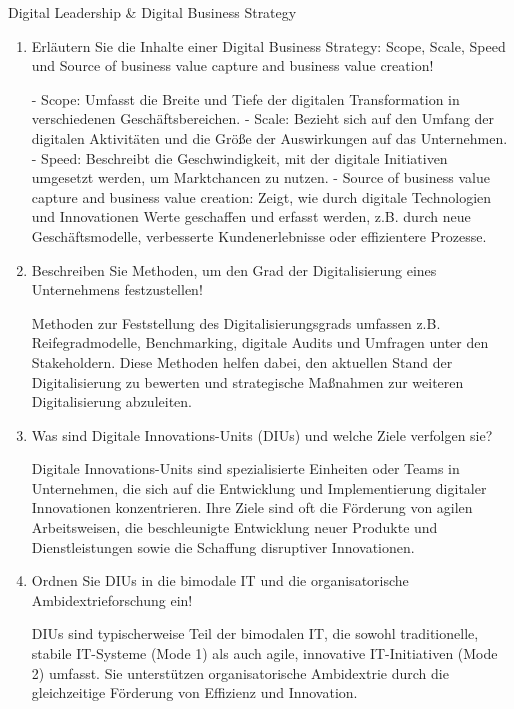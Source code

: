 \documentclass{article}
\begin{document}
\begin{exercise}{Digital Leadership \& Digital Business Strategy}
\begin{enumerate}
    \item Erläutern Sie die Inhalte einer Digital Business Strategy: Scope, Scale, Speed und Source of business value capture and business value creation!
          \begin{solution}
            - Scope: Umfasst die Breite und Tiefe der digitalen Transformation in verschiedenen Geschäftsbereichen.
            - Scale: Bezieht sich auf den Umfang der digitalen Aktivitäten und die Größe der Auswirkungen auf das Unternehmen.
            - Speed: Beschreibt die Geschwindigkeit, mit der digitale Initiativen umgesetzt werden, um Marktchancen zu nutzen.
            - Source of business value capture and business value creation: Zeigt, wie durch digitale Technologien und Innovationen Werte geschaffen und erfasst werden, z.B. durch neue Geschäftsmodelle, verbesserte Kundenerlebnisse oder effizientere Prozesse.
          \end{solution}

    \item Beschreiben Sie Methoden, um den Grad der Digitalisierung eines Unternehmens festzustellen!
          \begin{solution}
            Methoden zur Feststellung des Digitalisierungsgrads umfassen z.B. Reifegradmodelle, Benchmarking, digitale Audits und Umfragen unter den Stakeholdern. Diese Methoden helfen dabei, den aktuellen Stand der Digitalisierung zu bewerten und strategische Maßnahmen zur weiteren Digitalisierung abzuleiten.
          \end{solution}

    \item Was sind Digitale Innovations-Units (DIUs) und welche Ziele verfolgen sie?
          \begin{solution}
            Digitale Innovations-Units sind spezialisierte Einheiten oder Teams in Unternehmen, die sich auf die Entwicklung und Implementierung digitaler Innovationen konzentrieren. Ihre Ziele sind oft die Förderung von agilen Arbeitsweisen, die beschleunigte Entwicklung neuer Produkte und Dienstleistungen sowie die Schaffung disruptiver Innovationen.
          \end{solution}

    \item Ordnen Sie DIUs in die bimodale IT und die organisatorische Ambidextrieforschung ein!
          \begin{solution}
            DIUs sind typischerweise Teil der bimodalen IT, die sowohl traditionelle, stabile IT-Systeme (Mode 1) als auch agile, innovative IT-Initiativen (Mode 2) umfasst. Sie unterstützen organisatorische Ambidextrie durch die gleichzeitige Förderung von Effizienz und Innovation.
          \end{solution}


\end{enumerate}
\end{exercise}
\end{document}

